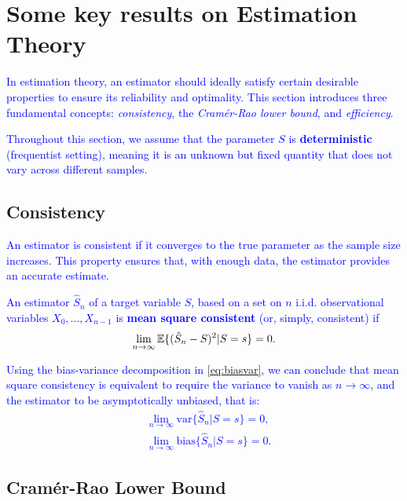 \section{Some key results on Estimation Theory}

\textcolor{blue}{In estimation theory, an estimator should ideally satisfy certain desirable properties to ensure its reliability and optimality. This section introduces three fundamental concepts: \textit{consistency}, the \textit{Cramér-Rao lower bound}, and \textit{efficiency}.}

\textcolor{blue}{Throughout this section, we assume that the parameter $S$ is \textbf{deterministic} (frequentist setting), meaning it is an unknown but fixed quantity that does not vary across different samples.}

\subsection{Consistency}

\textcolor{blue}{An estimator is consistent if it converges to the true parameter as the sample size increases. This property ensures that, with enough data, the estimator provides an accurate estimate.
\begin{definition}
An estimator $\hat{S}_n$ of a target variable $S$, based on a set on $n$ i.i.d. observational variables $X_0,\ldots, X_{n-1}$  is \textbf{mean square consistent} (or, simply, consistent) if
\begin{equation}
\lim_{n \to \infty} \mathbb{E}\{(\hat{S}_n - S)^2 | S=s\} = 0.
\end{equation}
\end{definition}}

\textcolor{blue}{Using the bias-variance decomposition in \eqref{eq:biasvar}, we can conclude that mean square consistency is equivalent to require the variance to vanish as $n \to \infty$, and the estimator to be asymptotically unbiased, that is:
\begin{align}
& \lim_{n \to \infty} \text{var}\{\hat{S}_n|S=s\}  = 0,   \\
& \lim_{n \to \infty} \text{bias}\{\hat{S}_n|S=s\} = 0.
\end{align}}


\subsection{Cramér-Rao Lower Bound}

